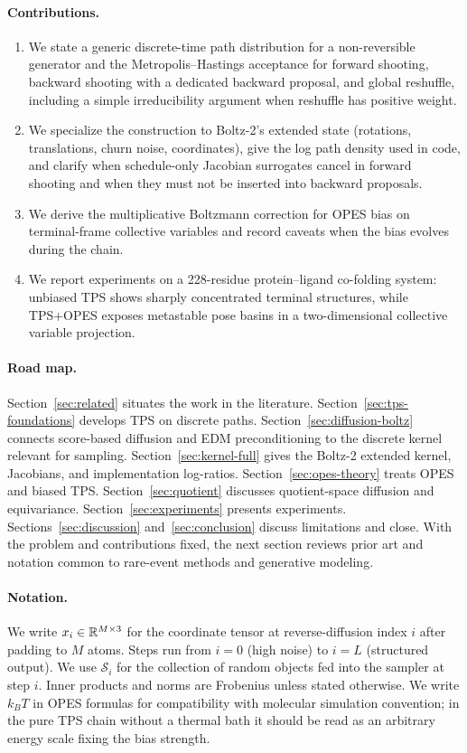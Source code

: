 \paragraph{Contributions.}
\begin{enumerate}
  \item We state a generic discrete-time path distribution for a
    non-reversible generator and the Metropolis--Hastings acceptance for forward
    shooting, backward shooting with a dedicated backward proposal, and global
    reshuffle, including a simple irreducibility argument when reshuffle has
    positive weight.
  \item We specialize the construction to Boltz-2's extended state (rotations,
    translations, churn noise, coordinates), give the log path density used in
    code, and clarify when schedule-only Jacobian surrogates cancel in forward
    shooting and when they must not be inserted into backward proposals.
  \item We derive the multiplicative Boltzmann correction for OPES bias on
    terminal-frame collective variables and record caveats when the bias
    evolves during the chain.
  \item We report experiments on a 228-residue protein--ligand co-folding
    system: unbiased TPS shows sharply concentrated terminal structures, while
    TPS+OPES exposes metastable pose basins in a two-dimensional collective
    variable projection.
\end{enumerate}

\paragraph{Road map.}
Section~\ref{sec:related} situates the work in the literature.
Section~\ref{sec:tps-foundations} develops TPS on discrete paths.
Section~\ref{sec:diffusion-boltz} connects score-based diffusion and EDM
preconditioning to the discrete kernel relevant for sampling.
Section~\ref{sec:kernel-full} gives the Boltz-2 extended kernel, Jacobians, and
implementation log-ratios. Section~\ref{sec:opes-theory} treats OPES and biased
TPS. Section~\ref{sec:quotient} discusses quotient-space diffusion and
equivariance. Section~\ref{sec:experiments} presents experiments.
Sections~\ref{sec:discussion} and~\ref{sec:conclusion} discuss limitations and
close. With the problem and contributions fixed, the next section reviews prior
art and notation common to rare-event methods and generative modeling.

\paragraph{Notation.}
We write $x_i \in \mathbb{R}^{M \times 3}$ for the coordinate tensor at reverse-diffusion
index $i$ after padding to $M$ atoms. Steps run from $i=0$ (high noise) to
$i=L$ (structured output). We use $\mathcal{S}_i$ for the collection of random
objects fed into the sampler at step $i$. Inner products and norms are
Frobenius unless stated otherwise. We write $k_BT$ in OPES formulas for
compatibility with molecular simulation convention; in the pure TPS chain
without a thermal bath it should be read as an arbitrary energy scale fixing
the bias strength.
